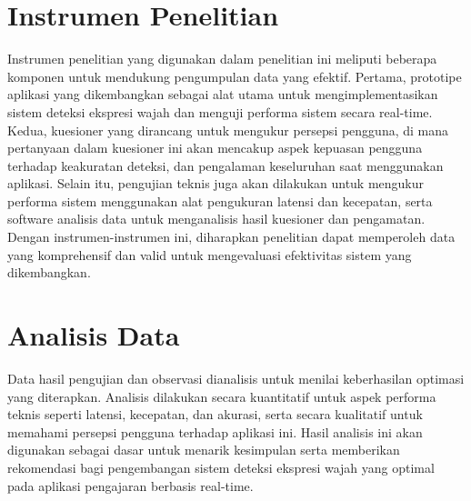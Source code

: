 \section{Instrumen Penelitian}
Instrumen penelitian yang digunakan dalam penelitian ini meliputi beberapa komponen untuk mendukung pengumpulan data yang efektif. Pertama, prototipe aplikasi yang dikembangkan sebagai alat utama untuk mengimplementasikan sistem deteksi ekspresi wajah dan menguji performa sistem secara real-time. Kedua, kuesioner yang dirancang untuk mengukur persepsi pengguna, di mana pertanyaan dalam kuesioner ini akan mencakup aspek kepuasan pengguna terhadap keakuratan deteksi, dan pengalaman keseluruhan saat menggunakan aplikasi. Selain itu, pengujian teknis juga akan dilakukan untuk mengukur performa sistem menggunakan alat pengukuran latensi dan kecepatan, serta software analisis data untuk menganalisis hasil kuesioner dan pengamatan. Dengan instrumen-instrumen ini, diharapkan penelitian dapat memperoleh data yang komprehensif dan valid untuk mengevaluasi efektivitas sistem yang dikembangkan.

\section{Analisis Data}
Data hasil pengujian dan observasi dianalisis untuk menilai keberhasilan optimasi yang diterapkan. Analisis dilakukan secara kuantitatif untuk aspek performa teknis seperti latensi, kecepatan, dan akurasi, serta secara kualitatif untuk memahami persepsi pengguna terhadap aplikasi ini. Hasil analisis ini akan digunakan sebagai dasar untuk menarik kesimpulan serta memberikan rekomendasi bagi pengembangan sistem deteksi ekspresi wajah yang optimal pada aplikasi pengajaran berbasis real-time.
